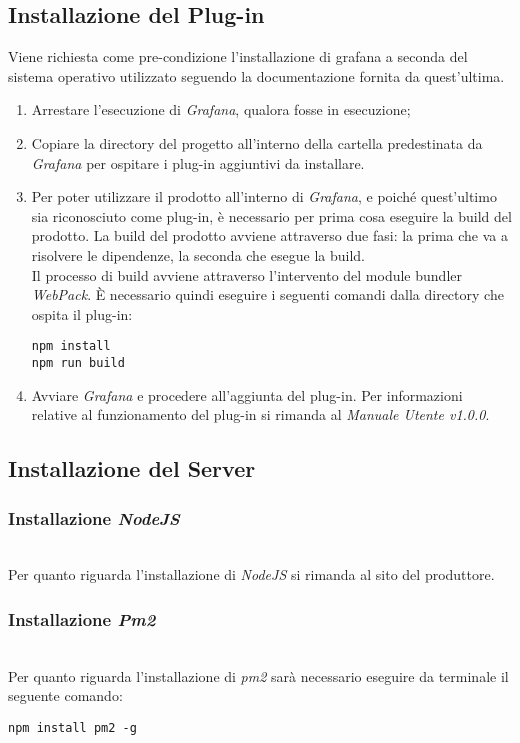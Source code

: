 \subsection{Installazione del Plug-in}
Viene richiesta come pre-condizione l'installazione di grafana a seconda del sistema operativo utilizzato seguendo la documentazione fornita da quest'ultima. 
\begin{enumerate}
	\item Arrestare l'esecuzione di \textit{Grafana}, qualora fosse in esecuzione;	
	\item Copiare la directory del progetto all'interno della cartella predestinata da \textit{Grafana} per ospitare i plug-in aggiuntivi da installare.
	\item Per poter utilizzare il prodotto all'interno di \textit{Grafana}, e poiché quest'ultimo sia riconosciuto come plug-in, è necessario per prima cosa eseguire la build del prodotto.
	La build del prodotto avviene attraverso due fasi: la prima che va a risolvere le dipendenze, la seconda che esegue la build.\\
	Il processo di build avviene attraverso l'intervento del module bundler \textit{WebPack}\glossario.
	È necessario quindi eseguire i seguenti comandi dalla directory che ospita il plug-in:
\begin{center}
	\texttt{npm install}\\
	\texttt{npm run build}
\end{center}
\item Avviare \textit{Grafana} e procedere all'aggiunta del plug-in.
Per informazioni relative al funzionamento del plug-in si rimanda al \textit{Manuale Utente v1.0.0}.
\end{enumerate}

\subsection{Installazione del Server}\label{installazione_server}
\subsubsection{Installazione \textit{NodeJS}}\-\\
Per quanto riguarda l'installazione di \textit{NodeJS} si rimanda al sito del produttore.

\subsubsection{Installazione \textit{Pm2}}\-\\
Per quanto riguarda l'installazione di \textit{pm2} sarà necessario eseguire da terminale il seguente comando:
\begin{center}
	\texttt{npm install pm2 -g}
\end{center}
	
